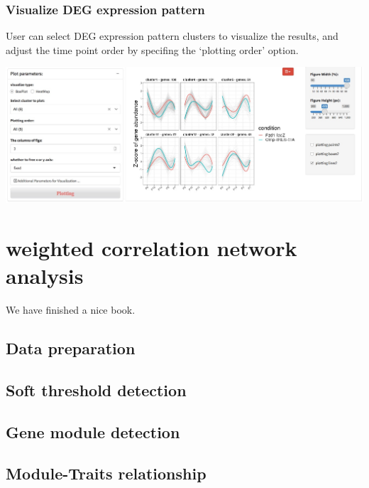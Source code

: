 \documentclass[
  a4paper,
  oneside]{book}
\begin{document}
\hypertarget{visualize-deg-expression-pattern-1}{%
\subsection{Visualize DEG expression pattern}\label{visualize-deg-expression-pattern-1}}

User can select DEG expression pattern clusters to visualize the results, and adjust the time point order by specifing the `plotting order' option.

\includegraphics{images/degp_multiple_factor_plots.jpeg}

\hypertarget{weighted-correlation-network-analysis}{%
\chapter{weighted correlation network analysis}\label{weighted-correlation-network-analysis}}

We have finished a nice book.

\hypertarget{data-preparation}{%
\section{Data preparation}\label{data-preparation}}

\hypertarget{soft-threshold-detection}{%
\section{Soft threshold detection}\label{soft-threshold-detection}}

\hypertarget{gene-module-detection}{%
\section{Gene module detection}\label{gene-module-detection}}

\hypertarget{module-traits-relationship}{%
\section{Module-Traits relationship}\label{module-traits-relationship}}
\end{document}
